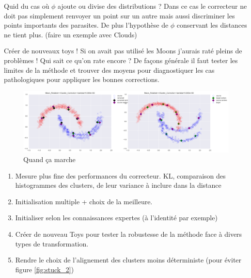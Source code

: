 
Quid du cas où $\phi$ ajoute ou divise des distributions ? Dans ce cas le 
correcteur ne doit pas simplement renvoyer un point sur un autre mais aussi 
discriminer les points importants des parasites. De plus l'hypothèse de $\phi$
conservant les distances ne tient plus.
(faire un exemple avec Clouds)

Créer de nouveaux toys ! Si on avait pas utilisé les Moons j'aurais raté 
pleins de problèmes ! Qui sait ce qu'on rate encore ? De façons générale il 
faut tester les limites de la méthode et trouver des moyens pour diagnostiquer
les cas pathologiques pour appliquer les bonnes corrections.

\begin{figure}[H] %
\centering
\includegraphics[width=\linewidth]{fig/21-04-2016/good_init.png}
\caption{Quand ça marche}
\label{fig:good_init}
\end{figure}


\begin{enumerate}
	\item Mesure plus fine des performances du correcteur. KL, comparaison des
	histogrammes des clusters, de leur variance à inclure dans la distance
	\item Initialisation multiple + choix de la meilleure.
	\item Initialiser selon les connaissances expertes (à l'identité par exemple)
	\item Créer de nouveau Toys pour tester la robustesse de la méthode face 
	à divers types de transformation.
	\item Rendre le choix de l'alignement des clusters moins déterministe 
	(pour éviter figure \ref{fig:stuck_2})
\end{enumerate}


